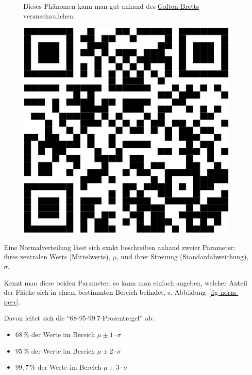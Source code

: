 \documentclass[
  letterpaper,
  twoside,
  open=any]{scrbook}
\providecommand{\tightlist}{%
  \setlength{\itemsep}{0pt}\setlength{\parskip}{0pt}}\usepackage{longtable,booktabs,array}
\theoremstyle{definition}
\theoremstyle{definition}
\theoremstyle{definition}
\theoremstyle{remark}
\begin{document}
\begin{figure}

\begin{minipage}{0.80\linewidth}
Dieses Phänomen kann man gut anhand des
\href{https://www.youtube.com/watch?v=3m4bxse2JEQ}{Galton-Bretts}
veranschaulichen.\end{minipage}%
%
\begin{minipage}{0.20\linewidth}

\begin{center}
\includegraphics[width=0.75\linewidth,height=\textheight,keepaspectratio]{040-verbildlichen_files/figure-pdf/unnamed-chunk-17-1.pdf}
\end{center}

\end{minipage}%

\end{figure}%

Eine Normalverteilung lässt sich exakt beschreiben anhand zweier
Parameter: ihres zentralen Werts (Mittelwerts), \(\mu\), und ihrer
Streuung (Standardabweichung), \(\sigma\).

Kennt man diese beiden Parameter, so kann man einfach angeben, welcher
Anteil der Fläche sich in einem bestimmten Bereich befindet, s.
Abbildung~\ref{fig-norm-perc}.

Davon leitet sich die \enquote{68-95-99.7-Prozentregel} ab:

\begin{itemize}
\tightlist
\item
  \(68\,\%\) der Werte im Bereich \(\mu\pm 1 \cdot \sigma\)
\item
  \(95\,\%\) der Werte im Bereich \(\mu\pm 2 \cdot \sigma\)
\item
  \(99{,}7\,\%\) der Werte im Bereich \(\mu\pm 3 \cdot \sigma\)
\end{itemize}
\end{document}
